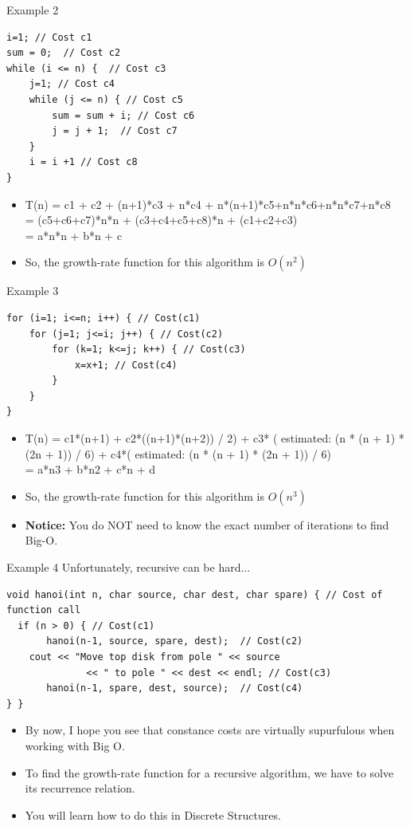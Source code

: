 \documentclass{beamer}
\begin{document}
\begin{frame}[fragile]{Example 2}
\begin{lstlisting}
i=1; // Cost c1
sum = 0;  // Cost c2
while (i <= n) {  // Cost c3
    j=1; // Cost c4
    while (j <= n) { // Cost c5
        sum = sum + i; // Cost c6
        j = j + 1;  // Cost c7
    }
    i = i +1 // Cost c8
}
\end{lstlisting}
\begin{itemize}
\item <2-> T(n)  =  c1 + c2 + (n+1)*c3 + n*c4 + n*(n+1)*c5+n*n*c6+n*n*c7+n*c8 \\
            = (c5+c6+c7)*n*n + (c3+c4+c5+c8)*n + (c1+c2+c3) \\
            = a*n*n + b*n + c \\
\item <2-> So, the growth-rate function for this algorithm is $O(n^2)$
\end{itemize}
\end{frame}

\begin{frame}[fragile]{Example 3}
\begin{lstlisting}
for (i=1; i<=n; i++) { // Cost(c1)
    for (j=1; j<=i; j++) { // Cost(c2)
        for (k=1; k<=j; k++) { // Cost(c3)
            x=x+1; // Cost(c4)
        }
    }
}
\end{lstlisting}
\begin{itemize}
\item <2-> T(n)  =  c1*(n+1) + c2*((n+1)*(n+2)) / 2) + c3* ( estimated: (n * (n + 1) * (2n + 1)) / 6) + c4*( estimated: (n * (n + 1) * (2n + 1)) / 6) \\
            = a*n3 + b*n2 + c*n + d
\item <2-> So, the growth-rate function for this algorithm is $O(n^3)$
\item <2-> \textbf{Notice:} You do NOT need to know the exact number of iterations to find Big-O.
\end{itemize}
\end{frame}

\begin{frame}[fragile]{Example 4}
Unfortunately, recursive can be hard...
\begin{lstlisting}
void hanoi(int n, char source, char dest, char spare) { // Cost of function call
  if (n > 0) { // Cost(c1)
       hanoi(n-1, source, spare, dest);  // Cost(c2)
    cout << "Move top disk from pole " << source
              << " to pole " << dest << endl; // Cost(c3)
       hanoi(n-1, spare, dest, source);  // Cost(c4)
} }
\end{lstlisting}
\begin{itemize}
\item By now, I hope you see that constance costs are virtually supurfulous when working with Big O.
\item To find the growth-rate function for a recursive algorithm, we have to solve its recurrence relation.
\item You will learn how to do this in Discrete Structures.
\end{itemize}
\end{frame}
\end{document}

